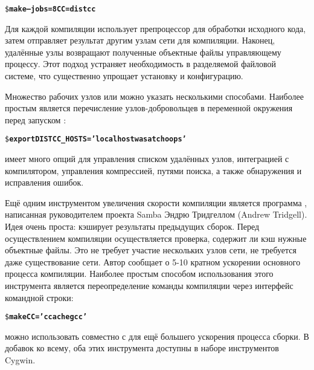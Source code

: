 {\footnotesize
\begin{alltt}
\$ \textbf{make --jobs=8 CC=distcc}
\end{alltt}
}

Для каждой компиляции  использует препроцессор
для обработки исходного кода, затем отправляет результат другим узлам
сети для компиляции. Наконец, удалённые узлы возвращают полученные
объектные файлы управляющему процессу. Этот подход устраняет
необходимость в разделяемой файловой системе, что существенно упрощает
установку и конфигурацию.

Множество рабочих узлов или  можно указать
несколькими способами. Наиболее простым является перечисление
узлов\hyp{}добровольцев в переменной окружения перед запуском
:

{\footnotesize
\begin{alltt}
\$ \textbf{export DISTCC\_HOSTS='localhost wasatch oops'}
\end{alltt}
}

 имеет много опций для управления списком удалённых
узлов, интеграцией с компилятором, управления компрессией, путями
поиска, а также обнаружения и исправления ошибок.

Ещё одним инструментом увеличения скорости компиляции является
программа , написанная руководителем проекта Samba
Эндрю Тридгеллом (Andrew Tridgell). Идея очень проста:
 кэширует результаты предыдущих сборок. Перед
осуществлением компиляции осуществляется проверка, содержит ли кэш
нужные объектные файлы. Это не требует участие нескольких узлов сети,
не требуется даже существование сети. Автор сообщает о 5-10 кратном
ускорении основного процесса компиляции. Наиболее простым способом
использования этого инструмента является переопределение команды
компиляции через интерфейс командной строки:

{\footnotesize
\begin{alltt}
\$ \textbf{make CC='ccache gcc'}
\end{alltt}
}

 можно использовать совместно с  для
ещё большего ускорения процесса сборки. В добавок ко всему, оба этих
инструмента доступны в наборе инструментов Cygwin.
